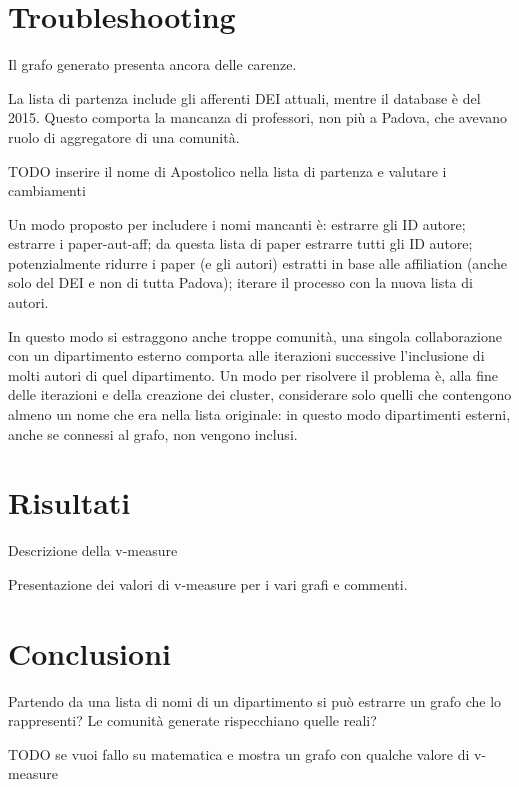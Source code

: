 \documentclass[12pt,a4paper,twoside]{report}
\begin{document}


\whitePage
\chapter{Troubleshooting} \label{cap:trouble}
Il grafo generato presenta ancora delle carenze.

La lista di partenza include gli afferenti DEI attuali, mentre il database è del 2015. Questo
comporta la mancanza di professori, non più a Padova, che avevano ruolo di aggregatore di una
comunità.

TODO inserire il nome di Apostolico nella lista di partenza e valutare i cambiamenti

Un modo proposto per includere i nomi mancanti è: estrarre gli ID autore; estrarre i paper-aut-aff;
da questa lista di paper estrarre tutti gli ID autore; potenzialmente ridurre i paper (e gli autori)
estratti in base alle affiliation (anche solo del DEI e non di tutta Padova); iterare il processo
con la nuova lista di autori.

In questo modo si estraggono anche troppe comunità, una singola collaborazione con un dipartimento
esterno comporta alle iterazioni successive l'inclusione di molti autori di quel dipartimento. Un
modo per risolvere il problema è, alla fine delle iterazioni e della creazione dei cluster,
considerare solo quelli che contengono almeno un nome che era nella lista originale: in questo modo
dipartimenti esterni, anche se connessi al grafo, non vengono inclusi.



\whitePage
\chapter{Risultati} \label{cap:risultati}
Descrizione della v-measure

Presentazione dei valori di v-measure per i vari grafi e commenti.



\whitePage
\chapter{Conclusioni} \label{cap:conclusioni}
Partendo da una lista di nomi di un dipartimento si può estrarre un grafo che lo rappresenti? Le comunità generate rispecchiano quelle reali?

TODO se vuoi fallo su matematica e mostra un grafo con qualche valore di v-measure






\end{document}
